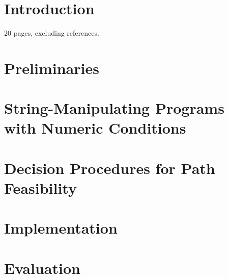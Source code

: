 \documentclass{llncs}
\begin{document}
\section{Introduction}

20 pages, excluding references.



\section{Preliminaries}\label{sec:prel}




\section{String-Manipulating Programs with Numeric Conditions}\label{sec:logic}





%


\section{Decision Procedures for Path Feasibility}\label{sec:dec}




\section{Implementation}




\section{Evaluation}
\end{document}
